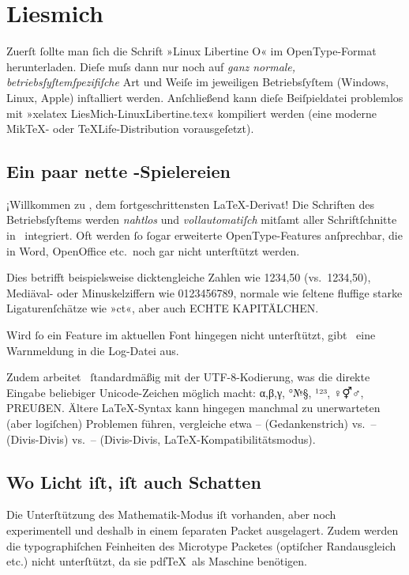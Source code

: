 \documentclass{scrartcl}
\begin{document}
\section*{Liesmich}
Zuerſt ſollte man ſich die Schrift »Linux Libertine O« im OpenType-Format herunterladen. Dieſe muſs dann nur noch auf \emph{ganz normale, betriebsſyſtemſpezifiſche} Art und Weiſe im jeweiligen Betriebsſyſtem (Windows, Linux, Apple) inſtalliert werden. Anſchließend kann dieſe Beiſpieldatei problemlos mit »xelatex LiesMich-LinuxLibertine.tex« kompiliert werden (eine moderne Mik\TeX- oder \TeX Life-Distribution vorausgeſetzt).


\subsection*{Ein paar nette \XeLaTeX-Spielereien}
¡Willkommen zu \XeLaTeX, dem fortgeschrittensten \LaTeX-Derivat! Die Schriften des Betriebsſyſtems werden \emph{nahtlos} und \emph{vollautomatiſch} mitſamt aller Schriftſchnitte in \XeTeX\ integriert. Oft werden ſo ſogar erweiterte OpenType-Features anſprechbar, die in Word, OpenOffice etc.\ noch gar nicht unterſtützt werden.

Dies betrifft beispielsweise dicktengleiche Zahlen wie {1234,50} (vs.\ 1234,50), Mediäval- oder Minuskelziffern wie {0123456789}, normale wie ſeltene {fluffige starke Ligaturenſchätze wie »ct«}, aber auch {ECHTE KAPITÄLCHEN}.


Wird ſo ein Feature im aktuellen Font hingegen nicht unterſtützt, gibt \XeLaTeX\ eine Warnmeldung in die Log-Datei aus.

Zudem arbeitet \XeTeX\ ſtandardmäßig mit der UTF-8-Kodierung, was die direkte Eingabe beliebiger Unicode-Zeichen möglich macht: α,β,γ, °№§, ¹²³, ♀⚥♂, PREUẞEN. Ältere \LaTeX-Syntax kann hingegen manchmal zu unerwarteten (aber logiſchen) Problemen führen, vergleiche etwa – (Gedankenstrich) vs.\ -- (Divis-Divis) vs.\ {-- (Divis-Divis, \LaTeX-Kompatibilitätsmodus)}.


\subsection*{Wo Licht iſt, iſt auch Schatten}
Die Unterſtützung des Mathematik-Modus iſt vorhanden, aber noch experimentell und deshalb in einem ſeparaten Packet ausgelagert. Zudem werden die typographiſchen Feinheiten des Microtype Packetes (optiſcher Randausgleich etc.) nicht unterſtützt, da sie pdf\TeX\ als Maschine benötigen.
\end{document}

